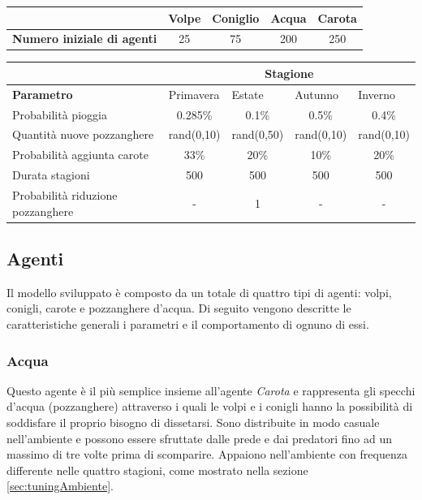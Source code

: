 \documentclass[11pt]{article}
\begin{document}
\begin{table}[h!]
\centering
{\renewcommand\arraystretch{1.9}
\begin{tabular}{l|cccc}
& \textbf{Volpe} & \textbf{Coniglio} & \textbf{Acqua} & \textbf{Carota} \\ \hline
\textbf{Numero iniziale di agenti} & 25    & 75       & 200   & 250   
\end{tabular}}
\end{table}

\begin{table}[h!]
\centering
{\renewcommand\arraystretch{1.6}
\begin{tabular}{p{}|cccc}
& \multicolumn{4}{c}{\textbf{Stagione}} \\   
\hline
\textbf{Parametro} & \multicolumn{1}{l}{Primavera} & \multicolumn {1}{l}{Estate} & \multicolumn{1}{l}{Autunno} & \multicolumn{1}{l}{Inverno} \\
\hline
Probabilità pioggia  & 0.285\%  & 0.1\%  & 0.5\% & 0.4\% \\
Quantità nuove pozzanghere & rand(0,10) & rand(0,50) & rand(0,10) & rand(0,10) \\
Probabilità aggiunta carote & 33\% & 20\% & 10\% & 20\% \\
Durata stagioni & 500 & 500 & 500 & 500 \\
Probabilità riduzione pozzanghere & -  & 1  & - & -    
\end{tabular}}
\end{table}

\subsection{Agenti}
Il modello sviluppato è composto da un totale di quattro tipi di agenti: volpi, conigli, carote e pozzanghere d'acqua. Di seguito vengono descritte le caratteristiche generali i parametri e il comportamento di ognuno di essi. 

\subsubsection{Acqua}
Questo agente è il più semplice insieme all'agente \emph{Carota} e rappresenta gli specchi d'acqua (pozzanghere) attraverso i quali le volpi e i conigli hanno la possibilità di soddisfare il proprio bisogno di dissetarsi. Sono distribuite in modo casuale nell'ambiente e possono essere sfruttate dalle prede e dai predatori fino ad un massimo di tre volte prima di scomparire. Appaiono nell'ambiente con frequenza differente nelle quattro stagioni, come mostrato nella sezione \ref{sec:tuningAmbiente}.  
\end{document}
